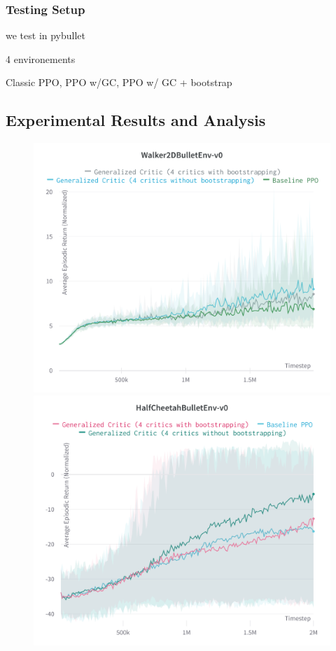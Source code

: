 \subsubsection{Testing Setup}



we test in pybullet

4 environements

Classic PPO, PPO w/GC, PPO w/ GC + bootstrap

\subsection{Experimental Results and Analysis}


\begin{figure}[!htb]

\begin{minipage}[b]{.5\linewidth}
  \centering
  \centerline{\includegraphics[width=\linewidth]{images/walker2D}}
\end{minipage}
\begin{minipage}[b]{.5\linewidth}
  \centering
  \centerline{\includegraphics[width=\linewidth]{images/halfcheetah}}

\end{minipage}
\end{figure}
